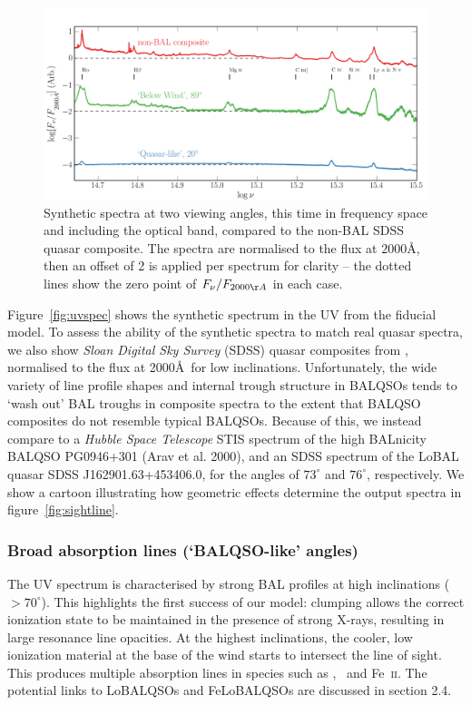 \documentclass[useAMS,usenatbib]{mn2e_x}
\begin{document}
\begin{figure}
\centering
\includegraphics[width=1.0\textwidth]{figures/sed.png}
\caption
{
Synthetic spectra at two viewing angles, 
this time in frequency space and including the optical band,
compared to the non-BAL SDSS quasar composite. The spectra are normalised to the flux at 
$2000$\AA, then an offset of 2 is applied per spectrum for clarity -- the dotted lines show the zero point of $F_\nu / F_{2000\AA}$ in each case.
}
\label{fig:sed}
\end{figure}

\noindent
Figure~\ref{fig:uvspec} shows the synthetic spectrum in the UV from the fiducial model. 
To assess the ability of the synthetic spectra to match real 
quasar spectra, we also show {\sl Sloan Digital Sky Survey} (SDSS) quasar
composites from \cite{reichard2003}, normalised to the flux at 2000\AA\
for low inclinations. Unfortunately, the wide variety of
line profile shapes and internal trough structure in BALQSOs
tends to `wash out' BAL troughs in composite spectra
to the extent that BALQSO composites do not resemble typical BALQSOs.
Because of this, we instead compare to a {\sl Hubble Space Telescope} 
STIS spectrum of the high BALnicity BALQSO PG0946+301 (Arav et al. 2000),
and an SDSS spectrum of the LoBAL quasar SDSS J162901.63+453406.0,
for the angles of $73^\circ$ and $76^\circ$, respectively. 
We show a cartoon illustrating how geometric effects determine
the output spectra in figure~\ref{fig:sightline}.  

\subsubsection{Broad absorption lines (`BALQSO-like' angles)}

The UV spectrum is characterised by strong BAL 
profiles at high inclinations ($> 70^\circ$). 
This highlights the first success of our model: 
clumping allows the correct ionization state 
to be maintained in the presence of strong X-rays, 
resulting in large resonance line opacities. 
At the highest inclinations, the 
cooler, low ionization material at the base of the wind
starts to intersect the line of sight. This produces 
multiple absorption lines in species such as \mg,
\al\ and Fe~\textsc{ii}. The potential links to LoBALQSOs and 
FeLoBALQSOs are discussed in section 2.4.
\end{document}
